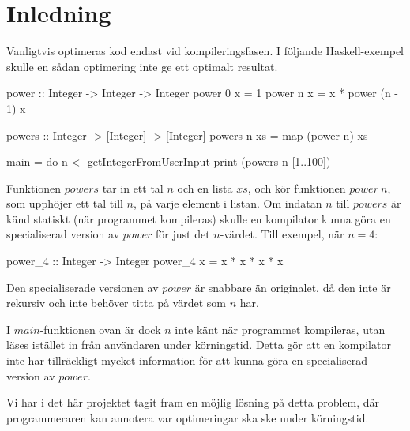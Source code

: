 \documentclass[Rapport]{subfiles}
\begin{document}
\section{Inledning}

Vanligtvis optimeras kod endast vid kompileringsfasen. I följande Haskell-exempel 
skulle en sådan optimering inte ge ett optimalt resultat.

\begin{codeEx}
power :: Integer -> Integer -> Integer
power 0 x = 1
power n x = x * power (n - 1) x

powers :: Integer -> [Integer] -> [Integer]
powers n xs = map (power n) xs

main = do
    n <- getIntegerFromUserInput
    print (powers n [1..100])
\end{codeEx}

Funktionen $powers$ tar in ett tal $n$ och en lista $xs$, och kör funktionen $power\:n$, 
som upphöjer ett tal till $n$, på varje element i listan. Om indatan $n$ till 
$powers$ är känd statiskt (när programmet kompileras) skulle en kompilator kunna 
göra en specialiserad version av $power$ för just det $n$-värdet. Till exempel, när $n=4$:

\begin{codeEx}
power_4 :: Integer -> Integer
power_4 x = x * x * x * x
\end{codeEx}

Den specialiserade versionen av $power$ är snabbare än originalet, då den inte är 
rekursiv och inte behöver titta på värdet som $n$ har.

I $main$-funktionen ovan är dock $n$ inte känt när programmet kompileras, utan läses 
istället in från användaren under körningstid. Detta gör att en kompilator inte 
har tillräckligt mycket information för att kunna göra en specialiserad version av $power$.

Vi har i det här projektet tagit fram en möjlig lösning på detta problem, där programmeraren kan 
annotera var optimeringar ska ske under körningstid. 
\end{document}
